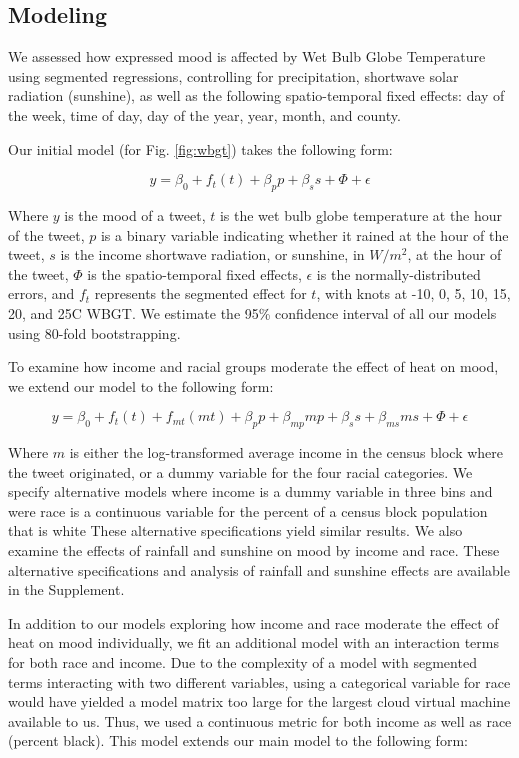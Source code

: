 \documentclass[fleqn,10pt]{wlscirep}
\begin{document}
\subsection*{Modeling}
We assessed how expressed mood is affected by Wet Bulb Globe Temperature using segmented regressions, controlling for precipitation, shortwave solar radiation (sunshine), as well as the following spatio-temporal fixed effects: day of the week, time of day, day of the year, year, month, and county. 

Our initial model (for Fig. \ref{fig:wbgt}) takes the following form:

\begin{equation}
 y = \beta_0 + f_t(t) + \beta_p p + \beta_s s + \Phi + \epsilon
 \label{mod:1}
\end{equation}

Where $y$ is the mood of a tweet, $t$ is the wet bulb globe temperature at the hour of the tweet, $p$ is a binary variable indicating whether it rained at the hour of the tweet, $s$ is the income shortwave radiation, or sunshine, in $W/m^2$, at the hour of the tweet, $\Phi$ is the spatio-temporal fixed effects, $\epsilon$ is the normally-distributed errors, and $f_t$ represents the segmented effect for $t$, with knots at -10\textdegree, 0\textdegree, 5\textdegree, 10\textdegree, 15\textdegree, 20\textdegree, and 25\textdegree C WBGT. We estimate the 95\% confidence interval of all our models using 80-fold bootstrapping. 

To examine how income and racial groups moderate the effect of heat on mood, we extend our model to the following form:

\begin{equation}
 y = \beta_0 + f_t(t) + f_{mt}(m t) + \beta_p p + \beta_{mp} m p + \beta_s s + \beta_{ms} m s + \Phi + \epsilon
 \label{mod:2}
\end{equation}

Where $m$ is either the log-transformed average income in the census block where the tweet originated, or a dummy variable for the four racial categories. We specify alternative models where income is a dummy variable in three bins and were race is a continuous variable for the percent of a census block population that is white These alternative specifications yield similar results. We also examine the effects of rainfall and sunshine on mood by income and race. These alternative specifications and analysis of rainfall and sunshine effects are available in the Supplement.

In addition to our models exploring how income and race moderate the effect of heat on mood individually, we fit an additional model with an interaction terms for both race and income. Due to the complexity of a model with segmented terms interacting with two different variables, using a categorical variable for race would have yielded a model matrix too large for the largest cloud virtual machine available to us. Thus, we used a continuous metric for both income as well as race (percent black). This model extends our main model to the following form:
\end{document}
